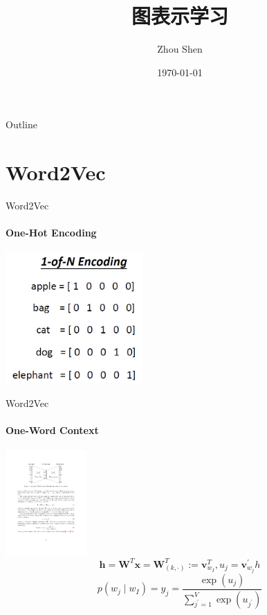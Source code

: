 \documentclass{beamer}
\title[Graph Embedding]{图表示学习}
\author[S. Zhou]{Zhou Shen}
\institute{School of Computer Science, Wuhan University}
\date{\today}
\begin{document}
\begin{frame}
    \titlepage
\end{frame}
\begin{frame}{Outline}
    \tableofcontents
\end{frame}
\section{Word2Vec}
\begin{frame}{Word2Vec}
    \framesubtitle{One-Hot Encoding}
    \centering\includegraphics[height=5cm]{one_hot.png}
\end{frame}
\begin{frame}{Word2Vec}
    \framesubtitle{One-Word Context}
    \centering\includegraphics[height=4cm]{word2vec_1.pdf}
    \begin{equation}
        \mathbf{h}=\mathbf{W}^{T} \mathbf{x}=\mathbf{W}_{(k, \cdot)}^{T}:=\mathbf{v}_{w_{I}}^{T}, u_j=\mathbf{v}_{w_j}^{\prime}h
    \end{equation}
    \begin{equation}
        p\left(w_{j} \mid w_{I}\right)=y_{j}=\frac{\exp \left(u_{j}\right)}{\sum_{j^{\prime}=1}^{V} \exp \left(u_{j^{\prime}}\right)}
    \end{equation}
\end{frame}
\end{document}
